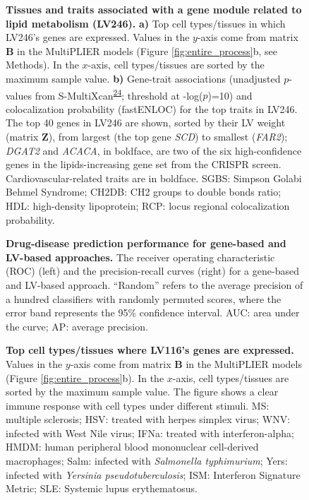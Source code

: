 \documentclass[
  a4paper,
]{article}
\begin{document}
\begin{figure}
\hypertarget{fig:lv246}{%
\centering
% 
\caption{\textbf{Tissues and traits associated with a gene module related to lipid metabolism (LV246).}
\textbf{a)} Top cell types/tissues in which LV246's genes are expressed.
Values in the \(y\)-axis come from matrix \(\mathbf{B}\) in the MultiPLIER models (Figure \ref{fig:entire_process}b, see Methods).
In the \(x\)-axis, cell types/tissues are sorted by the maximum sample value.
\textbf{b)} Gene-trait associations (unadjusted \(p\)-values from S-MultiXcan\textsuperscript{\protect\hyperlink{ref-1FFzCXo1s}{24}}; threshold at -log(\(p\))=10) and colocalization probability (fastENLOC) for the top traits in LV246.
The top 40 genes in LV246 are shown, sorted by their LV weight (matrix \(\mathbf{Z}\)), from largest (the top gene \emph{SCD}) to smallest (\emph{FAR2});
\emph{DGAT2} and \emph{ACACA}, in boldface, are two of the six high-confidence genes in the lipids-increasing gene set from the CRISPR screen.
Cardiovascular-related traits are in boldface.
SGBS: Simpson Golabi Behmel Syndrome;
CH2DB: CH2 groups to double bonds ratio;
HDL: high-density lipoprotein;
RCP: locus regional colocalization probability.
}\label{fig:lv246}
}
\end{figure}

\begin{figure}
\hypertarget{fig:drug_disease:roc_pr}{%
\centering
% 
\caption{\textbf{Drug-disease prediction performance for gene-based and LV-based approaches.}
The receiver operating characteristic (ROC) (left) and the precision-recall curves (right) for a gene-based and LV-based approach.
``Random'' refers to the average precision of a hundred classifiers with randomly permuted scores, where the error band represents the 95\% confidence interval.
AUC: area under the curve; AP: average precision.}\label{fig:drug_disease:roc_pr}
}
\end{figure}

\begin{figure}
\hypertarget{fig:lv116:cell_types}{%
\centering
% 
\caption{\textbf{Top cell types/tissues where LV116's genes are expressed.}
Values in the \(y\)-axis come from matrix \(\mathbf{B}\) in the MultiPLIER models (Figure \ref{fig:entire_process}b).
In the \(x\)-axis, cell types/tissues are sorted by the maximum sample value.
The figure shows a clear immune response with cell types under different stimuli.
MS: multiple sclerosis;
HSV: treated with herpes simplex virus;
WNV: infected with West Nile virus;
IFNa: treated with interferon-alpha;
HMDM: human peripheral blood mononuclear cell-derived macrophages;
Salm: infected with \emph{Salmonella typhimurium};
Yers: infected with \emph{Yersinia pseudotuberculosis};
ISM: Interferon Signature Metric;
SLE: Systemic lupus erythematosus.}\label{fig:lv116:cell_types}
}
\end{figure}
\end{document}
